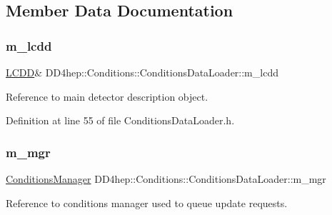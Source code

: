 \subsection{Member Data Documentation}
\hypertarget{class_d_d4hep_1_1_conditions_1_1_conditions_data_loader_a6920143ee0788f253031a3d0a25e2d0f}{}\label{class_d_d4hep_1_1_conditions_1_1_conditions_data_loader_a6920143ee0788f253031a3d0a25e2d0f} 
\subsubsection{\texorpdfstring{m\+\_\+lcdd}{m\_lcdd}}
{\footnotesize\ttfamily \hyperlink{class_d_d4hep_1_1_geometry_1_1_l_c_d_d}{L\+C\+DD}\& D\+D4hep\+::\+Conditions\+::\+Conditions\+Data\+Loader\+::m\+\_\+lcdd\hspace{0.3cm}{\ttfamily [protected]}}



Reference to main detector description object. 



Definition at line 55 of file Conditions\+Data\+Loader.\+h.

\hypertarget{class_d_d4hep_1_1_conditions_1_1_conditions_data_loader_a470c95c837745118517cc86bdc668346}{}\label{class_d_d4hep_1_1_conditions_1_1_conditions_data_loader_a470c95c837745118517cc86bdc668346} 
\subsubsection{\texorpdfstring{m\+\_\+mgr}{m\_mgr}}
{\footnotesize\ttfamily \hyperlink{class_d_d4hep_1_1_conditions_1_1_conditions_manager}{Conditions\+Manager} D\+D4hep\+::\+Conditions\+::\+Conditions\+Data\+Loader\+::m\+\_\+mgr\hspace{0.3cm}{\ttfamily [protected]}}



Reference to conditions manager used to queue update requests. 



